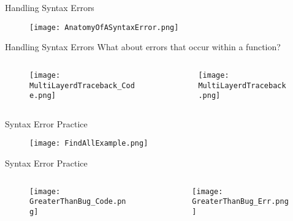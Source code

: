 \documentclass[10pt, aspectratio=169]{beamer}
\begin{document}
\begin{frame}{Handling Syntax Errors}
    \begin{figure}
        \texttt{[image: AnatomyOfASyntaxError.png]}
    \end{figure}
\end{frame}

\begin{frame}{Handling Syntax Errors}
    What about errors that occur within a function?
    \begin{columns}
        \begin{column}{0.35\textwidth}
            \begin{figure}
                \texttt{[image: MultiLayerdTraceback\_Code.png]}
            \end{figure}
        \end{column}
        \begin{column}{0.65\textwidth}
            \begin{figure}
                \texttt{[image: MultiLayerdTraceback.png]}
            \end{figure}
        \end{column}
    \end{columns} 
\end{frame}

\begin{frame}{Syntax Error Practice}
    \begin{figure}
        \texttt{[image: FindAllExample.png]}
    \end{figure}
\end{frame}

\begin{frame}{Syntax Error Practice}
    \begin{columns}
        \begin{column}{0.4\textwidth}
            \begin{figure}
                \texttt{[image: GreaterThanBug\_Code.png]}
            \end{figure}
        \end{column}
        \begin{column}{0.6\textwidth}
            \begin{figure}
                \texttt{[image: GreaterThanBug\_Err.png]}
            \end{figure}
        \end{column}
    \end{columns}
\end{frame}
\end{document}
